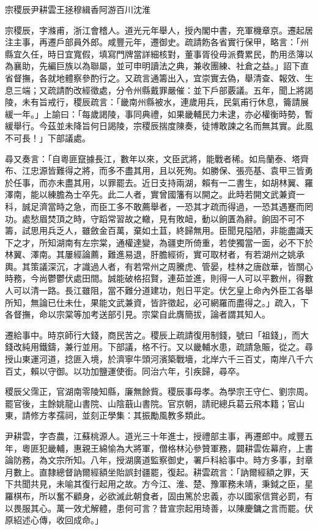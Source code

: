 
\begin{pinyinscope}
宗稷辰尹耕雲王拯穆緝香阿游百川沈淮

宗稷辰，字滌甫，浙江會稽人。道光元年舉人，授內閣中書，充軍機章京。遷起居注主事，再遷戶部員外郎。咸豐元年，遷御史。疏請飭各省實行保甲，略言：「州縣宜久任，時日宜寬假，填寫門牌當詳細核對，董事胥役毋派費累民，酌用丞簿以為襄助，先編巨族以為聯屬，並可申明讀法之典，兼收團練、社倉之益。」詔下直省督撫，各就地體察參酌行之。又疏言通籌出入，宜崇實去偽，舉清查、報效、生息三端；又疏請酌改經徵處，分令州縣戴罪嚴催：並下戶部覈議。五年，聞上將謁陵，未有旨戒行，稷辰疏言：「畿南州縣被水，連歲用兵，民氣甫行休息，籥請展緩一年。」上諭曰：「每歲謁陵，事同典禮，如果畿輔民力未逮，亦必權衡時勢，暫緩舉行。今茲並未降旨何日謁陵，宗稷辰揣度陳奏，徒博敢諫之名而無其實。此風不可長！」下部議處。

尋又奏言：「自粵匪竄據長江，數年以來，文臣武將，能戰者稀。如烏蘭泰、塔齊布、江忠源皆難得之將，而多不盡其用，且以死殉。如勝保、張亮基、袁甲三皆勇於任事，而亦未盡其用，以罪罷去。近日支持兩湖，賴有一二書生，如胡林翼、羅澤南，能以練膽為士卒先。此二人者，實曾國籓有以開之。此時若開文武兼資一科，誠足濟當時之急，而臣工多不敢薦舉者，一恐其才疏而得過，一恐其遇蹇而罔功。處愁眉焚頂之時，守蹈常習故之轍，見有敗衄，動以餉匱為辭。餉固不可不籌，試思用兵乏人，雖斂金百萬，棄如土苴，終歸無用。臣聞見隘陋，非能盡識天下之才，所知湖南有左宗棠，通權達變，為疆吏所倚重，若使獨當一面，必不下於林翼、澤南。其屢經論薦，難進易退，肝膽經術，實可取材者，有若湖州之姚承輿。其策議深沉，才識過人者，有若常州之周騰虎、管晏，桂林之唐啟華，皆關心時務，今尚鬱鬱伏處田間。誠能破格招賢，連茹並進，則得一人可以平數州，得數人可以清一路。長江雖阻，當不難分道建功，剋日平定。伏乞皇上命內外臣工各舉所知，無論已仕未仕，果能文武兼資，皆許徵起，必可網羅而盡得之。」疏入，下各督撫，命以宗棠等加考送部引見。宗棠自此膺簡拔，論者謂其知人。

遷給事中。時京師行大錢，商民苦之。稷辰上疏請復用制錢，號曰「祖錢」，而大錢改純用鐵鑄，兼行並用。下部議，格不行。又以畿輔水患，疏請急賑，從之。尋授山東運河道，捻匪入境，於濟寧牛頭河濱築戰墻，北岸六千三百丈，南岸八千六百丈，賴以守御。以功加鹽運使銜。同治六年，引疾歸，尋卒。

稷辰父霈正，官湖南零陵知縣，廉無餘貲。稷辰事母孝。為學宗王守仁、劉宗周。罷官後，主餘姚龍山書院、山陰蕺山書院。官京朝，請祀總兵葛云飛本籍；官山東，請修方孝孺祠，並刻正學集：其振勵風教多類此。

尹耕雲，字杏農，江蘇桃源人。道光三十年進士，授禮部主事，再遷郎中。咸豐五年，粵匪犯畿輔，惠親王綿愉為大將軍，僧格林沁參贊軍務，闢耕雲佐幕府，上書論防務，為文宗所知。八年，授湖廣道監察御史，署戶科給事中。時方多事，封章月數上。直隸總督訥爾經額坐貽誤封疆罷，復起。耕雲疏言：「訥爾經額之罪，天下共聞共見，未喻其復行起用之故。方今江、淮、楚、豫軍務未靖，秉鉞之臣，星羅棋布，所以奮不顧身，必欲滅此朝食者，固由篤於忠義，亦以國家信賞必罰，有以畏服其心。萬一效尤解體，患何可言？昔宣宗起用琦善，以陳慶鏞之言而罷。伏原紹述心傳，收回成命。」


\end{pinyinscope}
